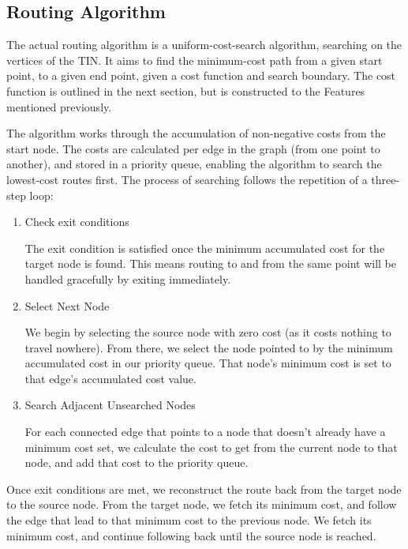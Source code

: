 \documentclass[12pt]{article}
\begin{document}
\subsection{Routing Algorithm}

The actual routing algorithm is a uniform-cost-search algorithm, searching on the vertices of the TIN. It aims to find the minimum-cost path from a given start point, to a given end point, given a cost function and search boundary. The cost function is outlined in the next section, but is constructed to the Features mentioned previously.

The algorithm works through the accumulation of non-negative costs from the start node. The costs are calculated per edge in the graph (from one point to another), and stored in a priority queue, enabling the algorithm to search the lowest-cost routes first. The process of searching follows the repetition of a three-step loop:

\begin{enumerate}
  \item Check exit conditions

        The exit condition is satisfied once the minimum accumulated cost for the target node is found. This means routing to and from the same point will be handled gracefully by exiting immediately.

  \item Select Next Node

        We begin by selecting the source node with zero cost (as it costs nothing to travel nowhere). From there, we select the node pointed to by the minimum accumulated cost in our priority queue. That node's minimum cost is set to that edge's accumulated cost value.

  \item Search Adjacent Unsearched Nodes

        For each connected edge that points to a node that doesn't already have a minimum cost set, we calculate the cost to get from the current node to that node, and add that cost to the priority queue.

\end{enumerate}

Once exit conditions are met, we reconstruct the route back from the target node to the source node. From the target node, we fetch its minimum cost, and follow the edge that lead to that minimum cost to the previous node. We fetch its minimum cost, and continue following back until the source node is reached.
\end{document}
